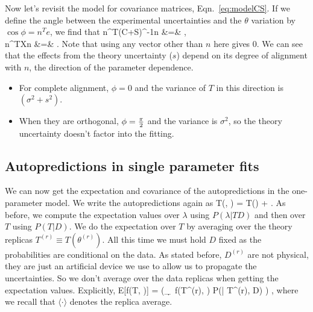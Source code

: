 Now let's revisit the model for covariance matrices, Eqn.~\ref{eq:modelCS}. If we define the angle between the experimental uncertainties and the $\theta$ variation by $\cos \phi = n^T e$, we find that
\bea
\label{eq:denom}
n^T(C+S)^{-1}n &=& ,\\
n^TXn &=& .
\eea
Note that using any vector other than $n$ here gives 0. We can see that the effects from the theory uncertainty ($s$) depend on its degree of alignment with $n$, the direction of the parameter dependence. 
\begin{itemize}
\item For complete alignment, $\phi=0$ and the variance of $T$ in this direction is $(\sigma^2 + s^2)$.
\item When they are orthogonal, $\phi= \hbox{${{\pi}\over {2}}$}$ and the variance is $\sigma^2$, so the theory uncertainty doesn't factor into the fitting.
\end{itemize}

\subsection{Autopredictions in single parameter fits}
We can now get the expectation and covariance of the autopredictions in the one-parameter model. We write the autopredictions again as
\be 
T(\theta, \lambda) = T(\theta) + \lambda \beta.
\ee
As before, we compute the expectation values over $\lambda$ using $P(\lambda |TD)$ and then over $T$ using $P(T|D)$. We do the expectation over $T$ by averaging over the theory replicas $T^{(r)} \equiv T(\theta^{(r)})$. All this time we must hold $D$ fixed as the probabilities are conditional on the data. As stated before, $D^{(r)}$ are not physical, they are just an artificial device we use to allow us to propagate the uncertainties. So we don't average over the data replicas when getting the expectation values. Explicitly, 
\be 
E[f(T, \lambda)] = \langle (_\lambda \int \d \lambda \ f(T^{(r)}, \lambda) P(\lambda | T^{(r)}, D) ) \rangle,
\ee
where we recall that $\langle \cdot \rangle$ denotes the replica average.

